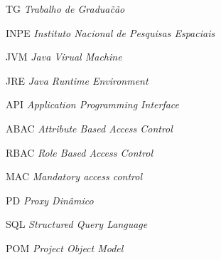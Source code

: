 \begin{siglas}
    \item[TG] \emph{Trabalho de Gradua\~c\~ao}
    \item[INPE] \emph{Instituto Nacional de Pesquisas Espaciais}
    \item[JVM] \emph{Java Virual Machine}
    \item[JRE] \emph{Java Runtime Environment}
    \item[API] \emph{Application Programming Interface}
    \item[ABAC]\emph{Attribute Based Access Control}
    \item[RBAC]\emph{Role Based Access Control}
    \item[MAC]\emph{Mandatory access control}
    \item[PD]\emph{Proxy Dinâmico}
    \item[SQL]\emph{Structured Query Language}
    \item[POM]\emph{Project Object Model}
\end{siglas}